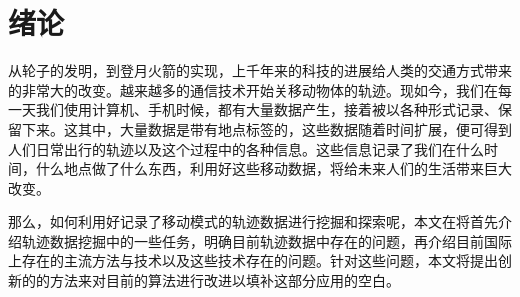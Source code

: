
\chapter{绪论}
\label{chapter:introduction}


从轮子的发明，到登月火箭的实现，上千年来的科技的进展给人类的交通方式带来的非常大的改变。越来越多的通信技术开始关移动物体的轨迹。现如今，我们在每一天我们使用计算机、手机时候，都有大量数据产生，接着被以各种形式记录、保留下来。这其中，大量数据是带有地点标签的，这些数据随着时间扩展，便可得到人们日常出行的轨迹以及这个过程中的各种信息。这些信息记录了我们在什么时间，什么地点做了什么东西，利用好这些移动数据，将给未来人们的生活带来巨大改变。

那么，如何利用好记录了移动模式的轨迹数据进行挖掘和探索呢，本文在将首先介绍轨迹数据挖掘中的一些任务，明确目前轨迹数据中存在的问题，再介绍目前国际上存在的主流方法与技术以及这些技术存在的问题。针对这些问题，本文将提出创新的的方法来对目前的算法进行改进以填补这部分应用的空白。

